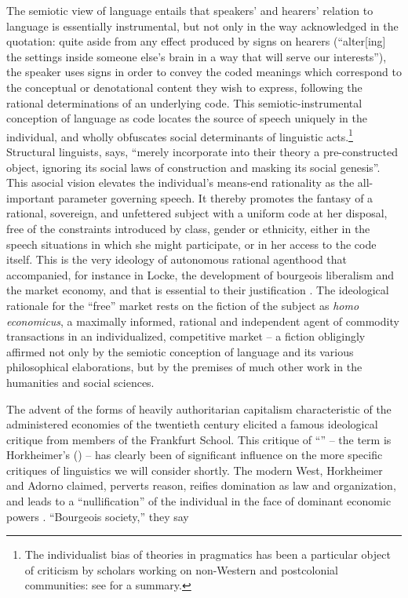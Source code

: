 \documentclass[output=paper]{langscibook}
\begin{document}
\noindent The semiotic view of language entails that speakers' and hearers' relation to language is essentially instrumental, but not only in the way acknowledged in the quotation: quite aside from any effect produced by signs on hearers (``alter[ing] the settings inside someone else’s brain in a way that will serve our interests''), the speaker uses signs in order to convey the coded meanings which correspond to the conceptual or denotational content they wish to express, following the rational determinations of an underlying code. This semiotic-instrumental conception of language as code locates the source of speech uniquely in the individual, and wholly obfuscates social determinants of linguistic acts.\footnote{The individualist bias of theories in pragmatics has been a particular object of criticism by scholars working on non-Western and postcolonial communities: see \citet{AnchimbeJanney2017} for a summary.} Structural linguists, \citet[44]{Bourdieu1991} says, ``merely incorporate into their theory a pre-constructed object, ignoring its social laws of construction and masking its social genesis''. This asocial vision elevates the individual's means-end rationality as the all-important parameter governing speech. It thereby promotes the fantasy of a rational, sovereign, and unfettered subject with a uniform code at her disposal, free of the constraints introduced by class, gender or ethnicity, either in the speech situations in which she might participate, or in her access to the code itself. This is the very ideology of autonomous rational agenthood that accompanied, for instance in Locke, the development of bourgeois liberalism and the market economy, and that is essential to their justification \citep{Losurdo2014}. The ideological rationale for the ``free'' market rests on the fiction of the subject as \emph{homo economicus}, a maximally informed, rational and independent agent of commodity transactions in an individualized, competitive market -- a fiction obligingly affirmed not only by the semiotic conception of language and its various philosophical elaborations, but by the premises of much other work in the humanities and social sciences.

The advent of the forms of heavily authoritarian capitalism characteristic of the administered economies of the twentieth century elicited a famous ideological critique from members of the Frankfurt School. This critique of ``'' -- the term is Horkheimer’s (\citeyear{Horkheimer19921947}) -- has clearly been of significant influence on the more specific critiques of linguistics we will consider shortly. The modern West, Horkheimer and Adorno claimed, perverts reason, reifies domination as law and organization, and leads to a ``nullification'' of the individual in the face of dominant economic powers \citep[xvii]{HorkheimerAdorno20021944}. ``Bourgeois society,'' they say
\end{document}
